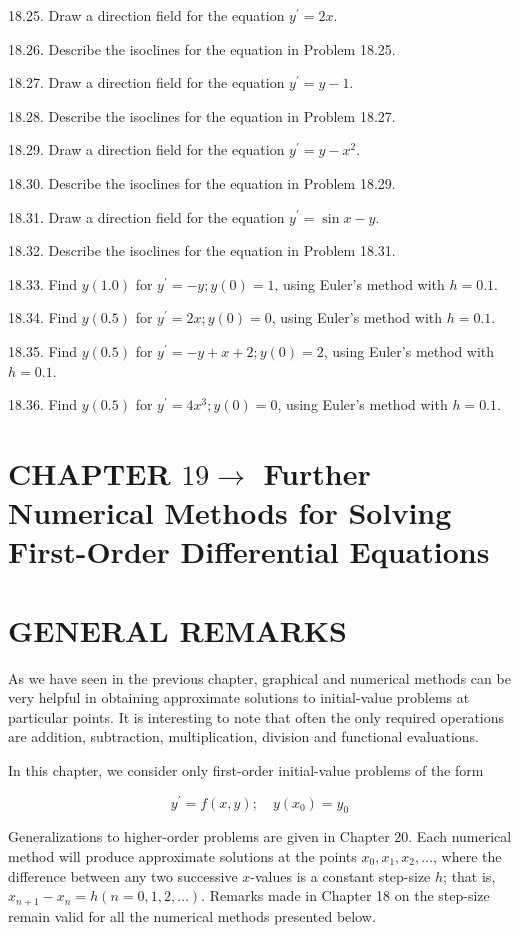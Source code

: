 \documentclass[10pt]{article}
\begin{document}
18.25. Draw a direction field for the equation $y^{\prime}=2 x$.

18.26. Describe the isoclines for the equation in Problem 18.25.

18.27. Draw a direction field for the equation $y^{\prime}=y-1$.

18.28. Describe the isoclines for the equation in Problem 18.27.

18.29. Draw a direction field for the equation $y^{\prime}=y-x^{2}$.

18.30. Describe the isoclines for the equation in Problem 18.29.

18.31. Draw a direction field for the equation $y^{\prime}=\sin x-y$.

18.32. Describe the isoclines for the equation in Problem 18.31.

18.33. Find $y(1.0)$ for $y^{\prime}=-y ; y(0)=1$, using Euler's method with $h=0.1$.

18.34. Find $y(0.5)$ for $y^{\prime}=2 x ; y(0)=0$, using Euler's method with $h=0.1$.

18.35. Find $y(0.5)$ for $y^{\prime}=-y+x+2 ; y(0)=2$, using Euler's method with $h=0.1$.

18.36. Find $y(0.5)$ for $y^{\prime}=4 x^{3} ; y(0)=0$, using Euler's method with $h=0.1$.

\section*{CHAPTER $19 \longrightarrow$ Further Numerical Methods for Solving First-Order Differential Equations}
\section*{GENERAL REMARKS}
As we have seen in the previous chapter, graphical and numerical methods can be very helpful in obtaining approximate solutions to initial-value problems at particular points. It is interesting to note that often the only required operations are addition, subtraction, multiplication, division and functional evaluations.

In this chapter, we consider only first-order initial-value problems of the form


\begin{equation*}
y^{\prime}=f(x, y) ; \quad y\left(x_{0}\right)=y_{0} \tag{19.1}
\end{equation*}


Generalizations to higher-order problems are given in Chapter 20. Each numerical method will produce approximate solutions at the points $x_{0}, x_{1}, x_{2}, \ldots$, where the difference between any two successive $x$-values is a constant step-size $h$; that is, $x_{n+1}-x_{n}=h(n=0,1,2, \ldots)$. Remarks made in Chapter 18 on the step-size remain valid for all the numerical methods presented below.
\end{document}
